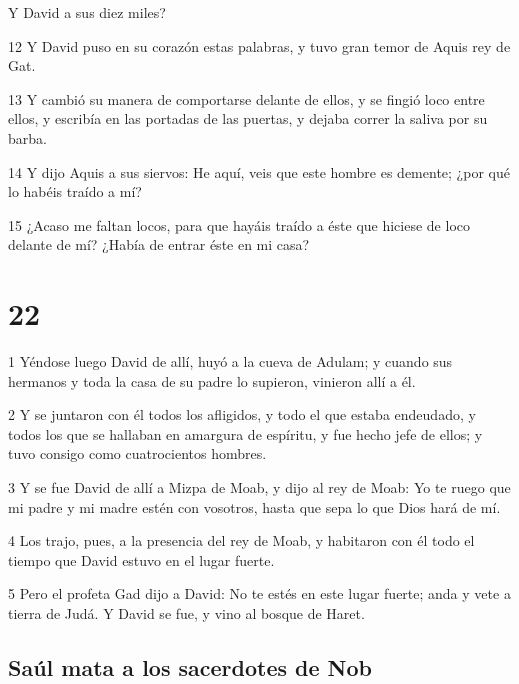 \par Y David a sus diez miles? 
\par 12 Y David puso en su corazón estas palabras, y tuvo gran temor de Aquis rey de Gat.
\par 13 Y cambió su manera de comportarse delante de ellos, y se fingió loco entre ellos, y escribía en las portadas de las puertas, y dejaba correr la saliva por su barba.
\par 14 Y dijo Aquis a sus siervos: He aquí, veis que este hombre es demente; ¿por qué lo habéis traído a mí?
\par 15 ¿Acaso me faltan locos, para que hayáis traído a éste que hiciese de loco delante de mí? ¿Había de entrar éste en mi casa?

\chapter{22}

\par 1 Yéndose luego David de allí, huyó a la cueva de Adulam; y cuando sus hermanos y toda la casa de su padre lo supieron, vinieron allí a él.
\par 2 Y se juntaron con él todos los afligidos, y todo el que estaba endeudado, y todos los que se hallaban en amargura de espíritu, y fue hecho jefe de ellos; y tuvo consigo como cuatrocientos hombres.
\par 3 Y se fue David de allí a Mizpa de Moab, y dijo al rey de Moab: Yo te ruego que mi padre y mi madre estén con vosotros, hasta que sepa lo que Dios hará de mí.
\par 4 Los trajo, pues, a la presencia del rey de Moab, y habitaron con él todo el tiempo que David estuvo en el lugar fuerte.
\par 5 Pero el profeta Gad dijo a David: No te estés en este lugar fuerte; anda y vete a tierra de Judá. Y David se fue, y vino al bosque de Haret.

\section*{Saúl mata a los sacerdotes de Nob}

